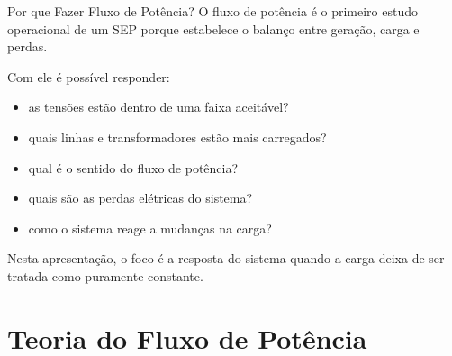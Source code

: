 \documentclass[aspectratio=169,11pt]{beamer}
\begin{document}
\begin{frame}{Por que Fazer Fluxo de Potência?}
  O fluxo de potência é o primeiro estudo operacional de um SEP porque estabelece o balanço entre geração, carga e perdas.

  \vspace{0.25cm}
  Com ele é possível responder:

  \begin{itemize}
    \item as tensões estão dentro de uma faixa aceitável?
    \item quais linhas e transformadores estão mais carregados?
    \item qual é o sentido do fluxo de potência?
    \item quais são as perdas elétricas do sistema?
    \item como o sistema reage a mudanças na carga?
  \end{itemize}

  \vspace{0.25cm}
  Nesta apresentação, o foco é a resposta do sistema quando a carga deixa de ser tratada como puramente constante.
\end{frame}

\section{Teoria do Fluxo de Potência}
\end{document}
